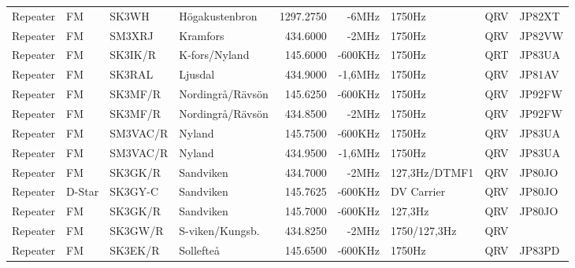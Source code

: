 \begin{landscape}
\begin{longtable}{llllrrlcl}
	Repeater          & FM           & SK3WH         & Högakustenbron   &         1297.2750 &          -6MHz & 1750Hz          &       QRV       & JP82XT           \\
	Repeater          & FM           & SM3XRJ        & Kramfors         &          434.6000 &          -2MHz & 1750Hz          &       QRV       & JP82VW           \\
	Repeater          & FM           & SK3IK/R       & K-fors/Nyland    &          145.6000 &        -600KHz & 1750Hz          &       QRT       & JP83UA           \\
	Repeater          & FM           & SK3RAL        & Ljusdal          &          434.9000 &        -1,6MHz & 1750Hz          &       QRV       & JP81AV           \\
	Repeater          & FM           & SK3MF/R       & Nordingrå/Rävsön &          145.6250 &        -600KHz & 1750Hz          &       QRV       & JP92FW           \\
	Repeater          & FM           & SK3MF/R       & Nordingrå/Rävsön &          434.8500 &          -2MHz & 1750Hz          &       QRV       & JP92FW           \\
	Repeater          & FM           & SM3VAC/R      & Nyland           &          145.7500 &        -600KHz & 1750Hz          &       QRV       & JP83UA           \\
	Repeater          & FM           & SM3VAC/R      & Nyland           &          434.9500 &        -1,6MHz & 1750Hz          &       QRV       & JP83UA           \\
	Repeater          & FM           & SK3GK/R       & Sandviken        &          434.7000 &          -2MHz & 127,3Hz/DTMF1   &       QRV       & JP80JO           \\
	Repeater          & D-Star       & SK3GY-C       & Sandviken        &          145.7625 &        -600KHz & DV Carrier      &       QRV       & JP80JO           \\
	Repeater          & FM           & SK3GK/R       & Sandviken        &          145.7000 &        -600KHz & 127,3Hz         &       QRV       & JP80JO           \\
	Repeater          & FM           & SK3GW/R       & S-viken/Kungsb.  &          434.8250 &          -2MHz & 1750/127,3Hz    &       QRV       &  \\
	Repeater          & FM           & SK3EK/R       & Sollefteå        &          145.6500 &        -600KHz & 1750Hz          &       QRV       & JP83PD           \\

\end{longtable}
\end{landscape}
